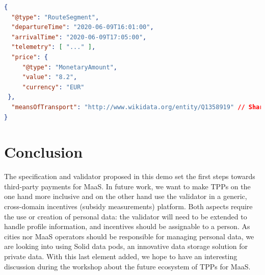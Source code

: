 \documentclass[runningheads]{llncs}
\begin{document}
\begin{lstlisting}[language=json, caption={This route segment is performed during rush hours in the centre of Leuven with a shared bike system.}, label={list:routesegment}]
{
  "@type": "RouteSegment",
  "departureTime": "2020-06-09T16:01:00",
  "arrivalTime": "2020-06-09T17:05:00",
  "telemetry": [ "..." ],
  "price": {
     "@type": "MonetaryAmount",
     "value": "8.2",
     "currency": "EUR"
 },
  "meansOfTransport": "http://www.wikidata.org/entity/Q1358919" // Shared bike
}
\end{lstlisting}

\section{Conclusion}

The specification and validator proposed in this demo set the first steps towards third-party payments for MaaS. In future work, we want to make TPPs on the one hand more inclusive and on the other hand use the validator in a generic, cross-domain incentives (subsidy measurements) platform. Both aspects require the use or creation of personal data: the validator will need to be extended to handle profile information, and incentives should be assignable to a person. As cities nor MaaS operators should be responsible for managing personal data, we are looking into using Solid data pods, an innovative data storage solution for private data. With this last element added, we hope to have an interesting discussion during the workshop about the future ecosystem of TPPs for MaaS.

%
%
%


%
\end{document}
